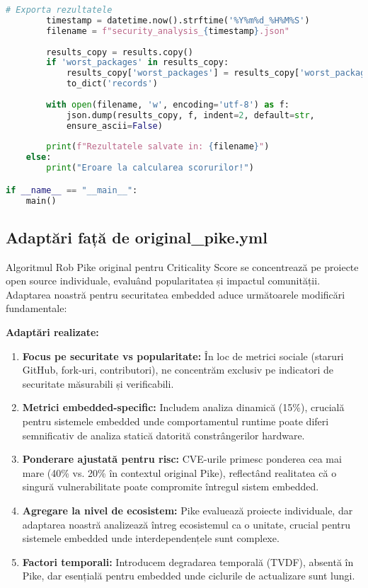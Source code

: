 \documentclass[12pt,a4paper]{article}
\begin{document}
\begin{lstlisting}[language=Python, caption=Script real pentru calcularea scorului de securitate (security\_calculator.py), label=lst:real_security_calculator]
        # Exporta rezultatele
        timestamp = datetime.now().strftime('%Y%m%d_%H%M%S')
        filename = f"security_analysis_{timestamp}.json"
        
        results_copy = results.copy()
        if 'worst_packages' in results_copy:
            results_copy['worst_packages'] = results_copy['worst_packages'].
            to_dict('records')
        
        with open(filename, 'w', encoding='utf-8') as f:
            json.dump(results_copy, f, indent=2, default=str, 
            ensure_ascii=False)
        
        print(f"Rezultatele salvate in: {filename}")
    else:
        print("Eroare la calcularea scorurilor!")

if __name__ == "__main__":
    main()
\end{lstlisting}

\subsection{Adaptări față de original\_pike.yml}

Algoritmul Rob Pike original pentru Criticality Score se concentrează pe proiecte open source individuale, evaluând popularitatea și impactul comunității. Adaptarea noastră pentru securitatea embedded aduce următoarele modificări fundamentale:

\textbf{Adaptări realizate:}

\begin{enumerate}
\item \textbf{Focus pe securitate vs popularitate:} În loc de metrici sociale (staruri GitHub, fork-uri, contributori), ne concentrăm exclusiv pe indicatori de securitate măsurabili și verificabili.

\item \textbf{Metrici embedded-specific:} Includem analiza dinamică (15\%), crucială pentru sistemele embedded unde comportamentul runtime poate diferi semnificativ de analiza statică datorită constrângerilor hardware.

\item \textbf{Ponderare ajustată pentru risc:} CVE-urile primesc ponderea cea mai mare (40\% vs. 20\% în contextul original Pike), reflectând realitatea că o singură vulnerabilitate poate compromite întregul sistem embedded.

\item \textbf{Agregare la nivel de ecosistem:} Pike evaluează proiecte individuale, dar adaptarea noastră analizează întreg ecosistemul ca o unitate, crucial pentru sistemele embedded unde interdependențele sunt complexe.

\item \textbf{Factori temporali:} Introducem degradarea temporală (TVDF), absentă în Pike, dar esențială pentru embedded unde ciclurile de actualizare sunt lungi.
\end{enumerate}
\end{document}
